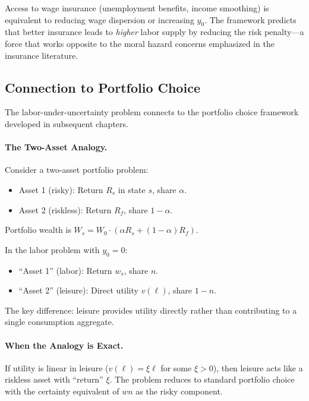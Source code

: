 \begin{calloutnote}
Access to wage insurance (unemployment benefits, income smoothing) is equivalent to reducing wage dispersion or increasing $y_0$. The framework predicts that better insurance leads to \emph{higher} labor supply by reducing the risk penalty---a force that works opposite to the moral hazard concerns emphasized in the insurance literature.
\end{calloutnote}

\subsection{Connection to Portfolio Choice}
\label{subsec:portfolio-connection}

The labor-under-uncertainty problem connects to the portfolio choice framework developed in subsequent chapters.

\paragraph{The Two-Asset Analogy.}
Consider a two-asset portfolio problem:
\begin{itemize}[leftmargin=2em]
\item Asset 1 (risky): Return $R_s$ in state $s$, share $\alpha$.
\item Asset 2 (riskless): Return $R_f$, share $1 - \alpha$.
\end{itemize}

Portfolio wealth is $W_s = W_0 \cdot (\alpha R_s + (1-\alpha) R_f)$.

In the labor problem with $y_0 = 0$:
\begin{itemize}[leftmargin=2em]
\item ``Asset 1'' (labor): Return $w_s$, share $n$.
\item ``Asset 2'' (leisure): Direct utility $v(\ell)$, share $1 - n$.
\end{itemize}

The key difference: leisure provides utility directly rather than contributing to a single consumption aggregate.

\paragraph{When the Analogy is Exact.}
If utility is linear in leisure ($v(\ell) = \xi \ell$ for some $\xi > 0$), then leisure acts like a riskless asset with ``return'' $\xi$. The problem reduces to standard portfolio choice with the certainty equivalent of $wn$ as the risky component.

